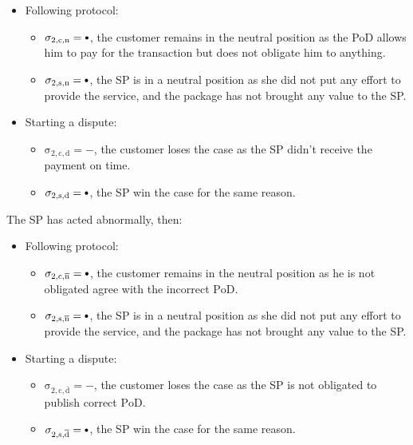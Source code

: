 \documentclass{ieeeaccess}
\newcommand\sbullet[1][.75]{\mathbin{\ThisStyle{\vcenter{\hbox{%
  \scalebox{#1}{$\SavedStyle\bullet$}}}}}%
}
\begin{document}
\begin{itemize}
\item
  Following protocol:

  \begin{itemize}
  
  \item
    \(\operatorname{\sigma_{2, c, n} = \sbullet}\), the customer remains in the neutral position as the PoD allows him to pay for the transaction but does not obligate him to anything.
  \item
    \(\operatorname{\sigma_{2, s, n} = \sbullet}\), the SP is in a neutral position as she did not put any effort to provide the service, and the package has not brought any value to the SP.
  \end{itemize}
\item
  Starting a dispute:

  \begin{itemize}
  
  \item
    \(\operatorname{\sigma_{2, c, d} = -}\), the customer loses the case as the SP didn't receive the payment on time.
  \item
    \(\operatorname{\sigma_{2, s, d} = \sbullet}\), the SP win the case for the same reason.
  \end{itemize}
\end{itemize}

The SP has acted abnormally, then:

\begin{itemize}
\item
  Following protocol:

  \begin{itemize}
  
  \item
    \(\operatorname{\sigma_{2, c, \overline{n}} = \sbullet}\), the customer remains in the neutral position as he is not obligated agree with the incorrect $\mathrm{PoD}$.
  \item
    \(\operatorname{\sigma_{2, s, \overline{n}} = \sbullet}\), the SP is in a neutral position as she did not put any effort to provide the service, and the package has not brought any value to the SP.
  \end{itemize}
\item
  Starting a dispute:

  \begin{itemize}
  
  \item
    \(\operatorname{\sigma_{2, c, \overline{d}} = -}\), the customer loses the case as the SP is not obligated to publish correct $\mathrm{PoD}$.
  \item
    \(\operatorname{\sigma_{2, s, \overline{d}} = \sbullet}\), the SP win the case for the same reason.
  \end{itemize}
\end{itemize}
\end{document}
